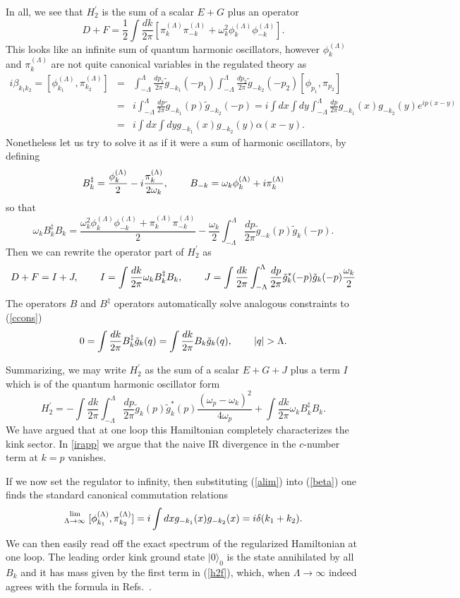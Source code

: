 \def\letter{0}\def\pr{0}\documentclass[a4paper,12pt, epsfig]{article}
\def\hsp{,\hspace{.7cm}}
\newcommand{\vac}{\ensuremath{|0\rangle}}
\renewcommand{\(}{\begin{equation}}
\renewcommand{\)}{end{equation} \vspace{-.05in}\linebreak}
\renewcommand{\=}{\hspace{-.03in}=\hspace{-.02in}}
\renewcommand{\(}{\begin{equation}}
\renewcommand{\)}{\end{equation}}
\renewcommand{\hsp}{,\hspace{.3in}}
\newcommand{\p}{^\prime}
\renewcommand{\(}{\begin{equation}}
\renewcommand{\)}{\end{equation}}
\def\lpin#1{\int^\Lambda_{-\Lambda} \frac{d#1}{2\pi}}
\def\pin#1{\int \frac{d#1}{2\pi}}
\renewcommand{\L}{{(\Lambda)}}
\newcommand{\beq}{\begin{equation}}
\newcommand{\eeq}{\end{equation}}
\newcommand{\bea}{\begin{eqnarray}}
\newcommand{\eea}{\end{eqnarray}}
\begin{document}
In all, we see that $H\p_2$ is the sum of a scalar $E+G$ plus an operator
\beq
D+F=\frac{1}{2}\pin{k}\left[\pi^\L_k\pi^\L_{-k}+\omega_k^2\phi^\L_{k}\phi^\L_{-k}\right].\label{dfo}
\eeq
This looks like an infinite sum of quantum harmonic oscillators, however $\phi^\L_k$ and $\pi^\L_k$ are not quite canonical variables in the regulated theory as
\bea
i\beta_{k_1k_2}=[\phi^\L_{k_1},\pi^\L_{k_2}]&=&\lpin{p_1}\tilde{g}_{-{k_1}}(-p_1)\lpin{p_2}\tilde{g}_{-k_2}(-p_2)[\phi_{p_1},\pi_{p_2}]\label{beta}\\
&=&i\lpin{p}\tilde{g}_{-{k_1}}(p)\tilde{g}_{-k_2}(-p)=i\int dx\int dy\lpin{p}g_{-{k_1}}(x)g_{-k_2}(y)e^{ip(x-y)}\nonumber\\
&=&i\int dx\int dyg_{-{k_1}}(x)g_{-k_2}(y)\alpha(x-y).\nonumber
\eea
Nonetheless let us try to solve it as if it were a sum of harmonic oscillators, by defining
\bea
B_k^\ddag=\frac{\phi^\L_k}{2}-i\frac{\pi^\L_k}{2\omega_k}\hsp
B_{-k}=\omega_k\phi^\L_k+i\pi^\L_k
\eea
so that
\beq
\omega_k B_k^\ddag B_k=\frac{\omega^2_k\phi^\L_k\phi^\L_{-k}+\pi^\L_k\pi^\L_{-k}}{2}-\frac{\omega_k}{2}\lpin{p}\tilde{g}_{{-k}}(p)\tilde{g}_{k}(-p).
\eeq
Then we can rewrite the operator part of $H\p_2$ as 
\beq
D+F=I+J\hsp I=\pin{k}\omega_k B_k^\ddag B_k\hsp 
J=\pin{k}\lpin{p}\tilde{g}^*_{{k}}(-p)\tilde{g}_{k}(-p)\frac{\omega_k}{2} \label{j}
\eeq
The operators $B$ and $B^\ddag$ operators automatically solve analogous constraints to (\ref{ccons})
\beq
0= \pin{k}B^\ddag_k \tilde{g}_k(q)= \pin{k}B_k \tilde{g}_k(q)\hsp |q|>\Lambda.  \label{bcons}
\eeq



Summarizing, we may write $H\p_2$ as the sum of a scalar $E+G+J$ plus a term $I$ which is of the quantum harmonic oscillator form
\beq
H\p_2=-\pin{k}\lpin{p} \tilde{g}_k(p)\tilde{g}^*_k(p) \frac{\left(\omega_{p}-\omega_k\right)^2}{4\omega_p}+\pin{k}\omega_k B_k^\ddag B_k. \label{h2f}
\eeq
We have argued that at one loop this Hamiltonian completely characterizes the kink sector.   In \ref{irapp} we argue that the naive IR divergence in the $c$-number term at $k=p$ vanishes.

If we now set the regulator to infinity, then substituting (\ref{alim}) into (\ref{beta}) one finds the standard canonical commutation relations
\beq
\stackrel{\rm{lim}}{{}_{\Lambda\rightarrow\infty}}[\phi^\L_{k_1},\pi^\L_{k_2}]=i\int dx g_{-k_1}(x)g_{-k_2}(x)=i\delta(k_1+k_2).
\eeq
We can then easily read off the exact spectrum of the regularized Hamiltonian at one loop.  The leading order kink ground state $\vac_0$ is the state annihilated by all $B_k$ and it has mass given by the first term in (\ref{h2f}), which, when $\Lambda\rightarrow\infty$ indeed agrees with the formula in Refs.~\cite{cahill76,mekink,memassa}. 
\end{document}
